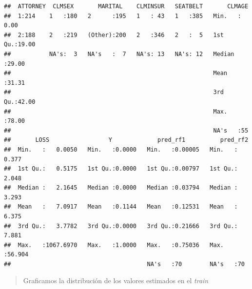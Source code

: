 \documentclass[]{book}
\newenvironment{Shaded}{\begin{snugshade}}{\end{snugshade}}
\newcommand{\DataTypeTok}[1]{\textcolor[rgb]{0.13,0.29,0.53}{#1}}
\newcommand{\DecValTok}[1]{\textcolor[rgb]{0.00,0.00,0.81}{#1}}
\newcommand{\KeywordTok}[1]{\textcolor[rgb]{0.13,0.29,0.53}{\textbf{#1}}}
\newcommand{\NormalTok}[1]{#1}
\newcommand{\OperatorTok}[1]{\textcolor[rgb]{0.81,0.36,0.00}{\textbf{#1}}}
\newcommand{\StringTok}[1]{\textcolor[rgb]{0.31,0.60,0.02}{#1}}
\begin{document}
\begin{verbatim}
##  ATTORNEY  CLMSEX       MARITAL    CLMINSUR   SEATBELT       CLMAGE     
##  1:214    1   :180   2      :195   1   : 43   1   :385   Min.   : 0.00  
##  2:188    2   :219   (Other):200   2   :346   2   :  5   1st Qu.:19.00  
##           NA's:  3   NA's   :  7   NA's: 13   NA's: 12   Median :29.00  
##                                                          Mean   :31.31  
##                                                          3rd Qu.:42.00  
##                                                          Max.   :78.00  
##                                                          NA's   :55     
##       LOSS                 Y             pred_rf1          pred_rf2     
##  Min.   :   0.0050   Min.   :0.0000   Min.   :0.00005   Min.   : 0.377  
##  1st Qu.:   0.5175   1st Qu.:0.0000   1st Qu.:0.00797   1st Qu.: 2.048  
##  Median :   2.1645   Median :0.0000   Median :0.03794   Median : 3.293  
##  Mean   :   7.0917   Mean   :0.1144   Mean   :0.12531   Mean   : 6.375  
##  3rd Qu.:   3.7782   3rd Qu.:0.0000   3rd Qu.:0.21666   3rd Qu.: 7.881  
##  Max.   :1067.6970   Max.   :1.0000   Max.   :0.75036   Max.   :56.904  
##                                       NA's   :70        NA's   :70
\end{verbatim}

\begin{quote}
Graficamos la distribución de los valores estimados en el \emph{train}
\end{quote}

\begin{Shaded}
\end{Shaded}
\end{document}
